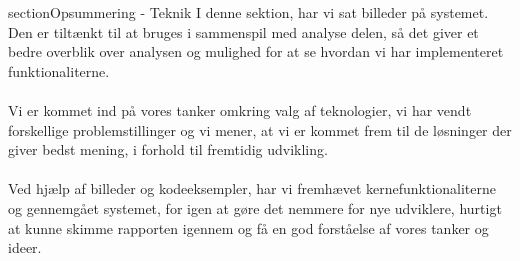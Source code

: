\hypertarget{teknik}{}
section{Opsummering - Teknik}
I denne sektion, har vi sat billeder på systemet. Den er tiltænkt til at bruges i sammenspil med analyse delen, så det  giver et bedre overblik over analysen og mulighed for at se
hvordan vi har implementeret funktionaliterne.
\\\\
Vi er kommet ind på vores tanker omkring valg af teknologier, vi har vendt forskellige problemstillinger og vi mener, at vi er kommet frem til de løsninger der giver bedst mening, i forhold til fremtidig udvikling.
\\\\
Ved hjælp af billeder og kodeeksempler, har vi fremhævet kernefunktionaliterne og gennemgået systemet, for igen at gøre det nemmere for nye udviklere, hurtigt at kunne skimme rapporten igennem og få en god forståelse af vores tanker og ideer.
